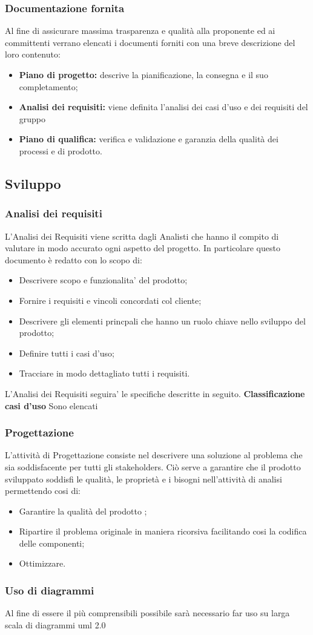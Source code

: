\documentclass{article}
\begin{document}
    \subsubsection{Documentazione fornita}
    Al fine di assicurare massima trasparenza e qualità alla proponente ed ai committenti verrano elencati i documenti forniti con una breve descrizione del loro contenuto:
    \begin{itemize}
        \item \textbf{Piano di progetto:} descrive la pianificazione, la consegna e il suo completamento;
        \item \textbf{Analisi dei requisiti:} viene definita l'analisi dei casi d'uso e dei requisiti del gruppo
        \item \textbf{Piano di qualifica:} verifica e validazione e garanzia della qualità dei processi e di prodotto.
    \end{itemize}
    \subsection{Sviluppo}
    \subsubsection{Analisi dei requisiti}
    L'Analisi dei Requisiti viene scritta dagli Analisti che hanno il compito di valutare in modo accurato ogni aspetto del progetto. In particolare questo documento è redatto con lo scopo di:
    \begin{itemize}
        \item Descrivere scopo e funzionalita' del prodotto;
        \item Fornire i requisiti e vincoli concordati col cliente;
        \item Descrivere gli elementi princpali che hanno un ruolo chiave nello sviluppo del prodotto;
        \item Definire tutti i casi d'uso;
        \item Tracciare in modo dettagliato tutti i requisiti.
    \end{itemize}
    L'Analisi dei Requisiti seguira' le specifiche descritte in seguito.\newline
    \textbf{Classificazione casi d'uso} Sono elencati
    \subsubsection{Progettazione}
    L'attività di Progettazione consiste nel descrivere una soluzione al problema che sia soddisfacente per tutti gli stakeholders. Ciò serve a garantire che il prodotto sviluppato soddisfi le qualità, le proprietà e i bisogni nell'attività di analisi permettendo cosi di:
    \begin{itemize}
        \item Garantire la qualità del prodotto ;
        \item Ripartire il problema originale in maniera ricorsiva facilitando cosi la codifica delle componenti;
        \item Ottimizzare.
    \end{itemize}	
    \subsubsection{Uso di diagrammi}
    Al fine di essere il più comprensibili possibile sarà necessario far uso su larga scala di diagrammi uml 2.0
\newpage

\newpage

\end{document}
